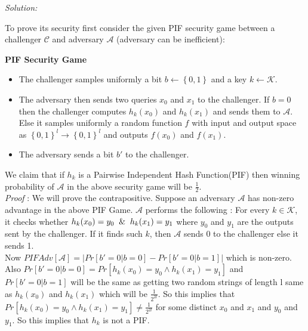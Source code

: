 \documentclass[a4paper, 11pt]{article}
\newenvironment{solution}
    {\textit{Solution:}}
    {\clearpage}
\newcommand{\bit}{\left\{0, 1\right\}}
\newcommand{\calA}{\mathcal{A}}
\newcommand{\calC}{\mathcal{C}}
\newcommand{\calK}{\mathcal{K}}
\begin{document}
\begin{solution}
\begin{enumerate}[(a)]
\begin{center}
        \end{center}
        To prove its security first consider the given PIF security game between a challenger $\calC$ and adversary $\calA$ (adversary can be inefficient):
        \begin{center}
            \textbf{PIF Security Game}
            \begin{itemize}
                \item The challenger samples uniformly a bit $b \gets \bit$ and a key $k \gets \calK$. 
                \item The adversary then sends two queries $x_0$ and $x_1$ to the challenger. If $b = 0$ then the challenger computes $h_k(x_0)$ and $h_k(x_1)$ and sends them to $\calA$. Else it samples uniformly a random function $f$ with input and output space as $\bit^{l} \rightarrow \bit^{l}$ and outputs $f(x_0)$ and $f(x_1)$.
                \item The adversary sends a bit $b'$ to the challenger.
            \end{itemize}
        \end{center}
        We claim that if $h_k$ is a Pairwise Independent Hash Function(PIF) then winning probability of $\calA$ in the above security game will be $\frac{1}{2}$. \\
        \textit{Proof} : We will prove the contrapositive. Suppose an adversary $\calA$ has non-zero advantage in the above PIF Game. $\calA$ performs the following : For every $k \in \calK$, it checks whether $h_k(x_0) = y_0 \And h_k(x_1) = y_1$ where $y_0$ and $y_1$ are the outputs sent by the challenger. If it finds such $k$, then $\calA$ sends $0$ to the challenger else it sends 1. \\ 
        Now $PIFAdv[\calA] = \Big| Pr[b'=0|b=0]-Pr[b'=0|b=1] \Big| $ which is non-zero.\\
        Also $Pr[b'=0|b=0] = Pr[h_k(x_0) = y_0 \land h_k(x_1) = y_1]$
        and $Pr[b'=0|b=1]$ will be the same as getting two random strings of length l same as $h_k(x_0)$ and $h_k(x_1)$ which will be $\frac{1}{2^{2l}}$. So this implies that $Pr[h_k(x_0) = y_0 \land h_k(x_1) = y_1] \ne \frac{1}{2^{2l}}$ for some distinct $x_0$ and $x_1$ and $y_0$ and $y_1$. So this implies that $h_k$ is not a PIF.\\


\end{enumerate}
\end{solution}
\end{document}
